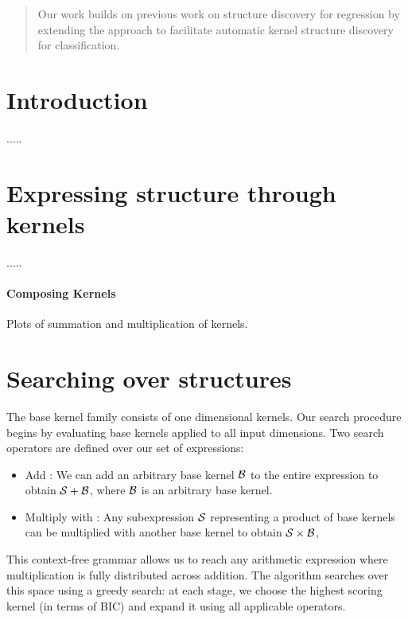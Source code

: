 \documentclass[twoside]{article}
\begin{document}


\begin{abstract} 

Our work builds on previous work on structure discovery for \gp{} regression by extending the approach to facilitate automatic kernel structure discovery for \gp{} classification. 

\end{abstract}


\section{Introduction}

.....

\section{Expressing structure through kernels} 

.....

\paragraph{Composing Kernels} Plots of summation and multiplication of \kSE{} kernels. 

\section{Searching over structures}

The base kernel family consists of one dimensional \kSE{} kernels. Our search procedure begins by evaluating base \kSE{} kernels applied to all input dimensions. Two search operators are defined over our set of expressions:
\begin{itemize}
\item Add \kSE{}: We can add an arbitrary base kernel ${\cal B}$ to the entire expression to obtain ${\cal S} + {\cal B}$, where ${\cal B}$ is an arbitrary base \kSE{} kernel.
\item Multiply with \kSE{}: Any subexpression ${\cal S}$ representing a product of base kernels can be multiplied with another base \kSE{} kernel to obtain ${\cal S} \times {\cal B}$, 
\end{itemize}

This context-free grammar allows us to reach any arithmetic expression where multiplication is fully distributed across addition. The algorithm searches over this space using a greedy search: at each stage, we choose the highest scoring kernel (in terms of BIC) 
and expand it using all applicable operators.
\end{document}
